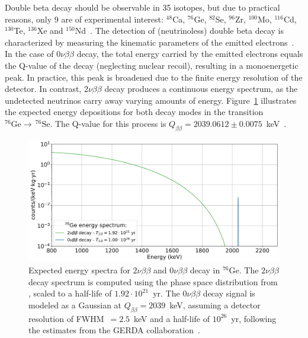 Double beta decay should be observable in 35 isotopes, but due to practical reasons, only 9 are of experimental interest: $^{48}$Ca, $^{76}$Ge, $^{82}$Se, $^{96}$Zr, $^{100}$Mo, $^{116}$Cd, $^{130}$Te, $^{136}$Xe and $^{150}$Nd~\cite{rodejohann_neutrino-less_2011}.
The detection of (neutrinoless) double beta decay is characterized by measuring the kinematic parameters of the emitted electrons~\cite{dolinski_neutrinoless_2019}. 
In the case of $0 \nu \beta \beta$ decay, the total energy carried by the emitted electrons equals the Q-value of the decay (neglecting nuclear recoil), resulting in a monoenergetic peak. 
In practice, this peak is broadened due to the finite energy resolution of the detector. In contrast, $2 \nu \beta \beta$ decay produces a continuous energy spectrum, as the undetected neutrinos carry away varying amounts of energy. 
Figure~\ref{fig:expected_energy_spec} illustrates the expected energy depositions for both decay modes in the transition $^{76} \mathrm{Ge} \rightarrow \, ^{76} \mathrm{Se}$.
The Q-value for this process is $Q_{\beta \beta} = 2039.0612 \pm 0.0075$~keV~\cite{Huang_2021}.

\begin{figure}
    \centering
    \includegraphics[width=0.95\linewidth]{figures/02_neutrino/Energyspectrum_Ge76.png}
    \caption{Expected energy spectra for $2 \nu \beta \beta$ and $0 \nu \beta \beta$ decay in $^{76}$Ge. The $2 \nu \beta \beta$ decay spectrum is computed using the phase space distribution from \cite{kotila_phasespace_2012}, scaled to a half-life of $1.92 \cdot 10^{21}$~yr. The $0 \nu \beta \beta$ decay signal is modeled as a Gaussian at $Q_{\beta \beta} = 2039$~keV, assuming a detector resolution of FWHM~$= 2.5$~keV and a half-life of $10^{26}$~yr, following the estimates from the GERDA collaboration~\cite{dandrea_neutrinoless_2021}.}
    \label{fig:expected_energy_spec}
\end{figure}


